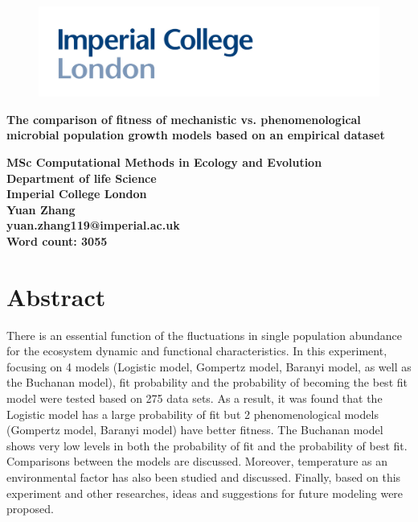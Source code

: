 \documentclass[11pt]{article}
\begin{document}
 
\begin{titlepage}
		
\begin{center}
			
\begin{figure}[t]
\centering
\includegraphics[width = \textwidth]{../Code/Materials/logo.jpg}
\end{figure}

		\vspace{1cm}
\Huge
\textbf{The comparison of fitness of mechanistic vs. phenomenological microbial population growth models based on an empirical dataset }\\
		
		\vspace{3cm}
		\Large
		
	
		\textbf{MSc Computational Methods in Ecology and Evolution}\\
		\textbf{Department of life Science}\\
		\textbf{Imperial College London}\\
		\vspace*{1cm}
 		\textbf{Yuan Zhang}\\   
		\textbf{yuan.zhang119@imperial.ac.uk}\\
		\vspace*{2cm}	
		\textbf{Word count: 3055}\\

		
		\end{center}

	\end{titlepage}
	
	\clearpage
	\tableofcontents
	
	
	\linenumbers %
	\doublespacing



\newpage

\section*{Abstract}
There is an essential function of the fluctuations in single population abundance for the ecosystem dynamic and functional characteristics. In this experiment, focusing on 4 models (Logistic model, Gompertz model, Baranyi model, as well as the Buchanan model), fit probability and the probability of becoming the best fit model were tested based on 275 data sets. As a result, it was found that the Logistic model has a large probability of fit but 2 phenomenological models (Gompertz model, Baranyi model) have better fitness. The Buchanan model shows very low levels in both the probability of fit and the probability of best fit. Comparisons between the models are discussed. Moreover, temperature as an environmental factor has also been studied and discussed. Finally, based on this experiment and other researches, ideas and suggestions for future modeling were proposed.  
\end{document}

